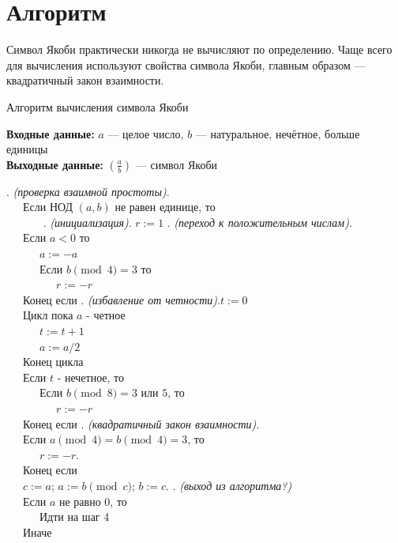 \documentclass[11pt]{article}
\begin{document}
\section{Алгоритм}
Символ Якоби практически никогда не вычисляют по определению. Чаще всего для вычисления используют свойства символа Якоби, главным образом — квадратичный закон взаимности.

\begin{algorithm}[ph]
	\caption{Алгоритм вычисления символа Якоби}
	\label{alg:AlgName}
	\textbf{Входные данные:} $a$ — целое число, $b$ — натуральное, нечётное, больше единицы\\
	\textbf{Выходные данные:} $\left(\frac{a}{b}\right)$ — символ Якоби
	
	\begin{algorithmic}
		
		. \textit{(проверка взаимной простоты)}.\\
		\ \ \ Если НОД $(a,b)$ не равен единице, то\\
		\ \ \ \ \ \ 
		. \textit{(инициализация)}. $r:=1$
		. \textit{(переход к положительным числам)}.\\
		\ \ \ Если $a<0$ то\\
		\ \ \ \ \ \ $a:=-a$\\
		\ \ \ \ \ \ Если $b \pmod 4 = 3$ то\\
		\ \ \ \ \ \ \ \ \ $r:=-r$\\
		\ \ \ Конец если
		. \textit{(избавление от четности)}.$t:=0$\\
		\ \ \ Цикл пока $a$ - четное\\
		\ \ \ \ \ \ $t:=t+1$\\
		\ \ \ \ \ \ $a:=a/2$\\
		\ \ \ Конец цикла\\
		\ \ \ Если $t$ - нечетное, то\\
		\ \ \ \ \ \ Если $b \pmod 8 =3$ или $5$, то\\
		\ \ \ \ \ \ \ \ \ $r:=-r$\\
		\ \ \ Конец если
		. \textit{(квадратичный закон взаимности)}.\\ 
		\ \ \ Если $a \pmod 4 = b \pmod 4 = 3$, то\\
		\ \ \ \ \ \ $r:=-r$.\\
		\ \ \ Конец если\\
  		\ \ \ $c:=a$; $a:=b \pmod c$; $b:=c$.
		. \textit{(выход из алгоритма?)}\\
		\ \ \ Если $a$ не равно $0$, то\\
		\ \ \ \ \ \ Идти на шаг 4\\
		\ \ \ Иначе\\
		\ \ \ \ \ \  
	\end{algorithmic}

\end{algorithm}
\end{document}
